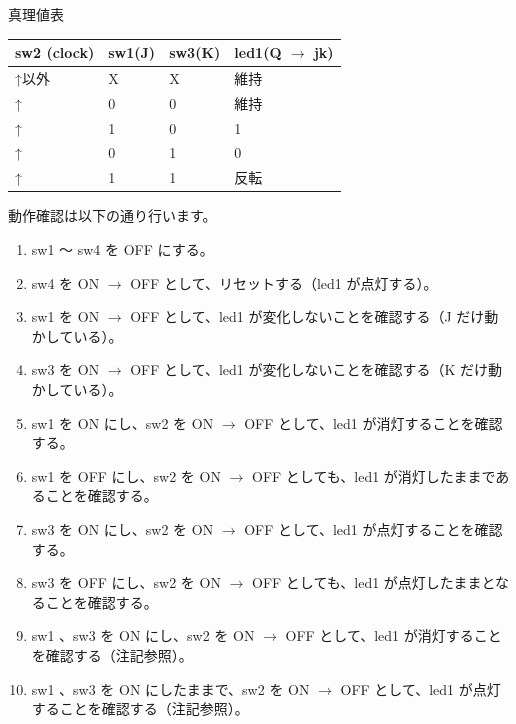 \documentclass[letterpaper,10pt,dvipdfmx]{sphinxmanual}
\begin{document}
\begin{threeparttable}
\capstart\caption{真理値表}\label{05_try:id32}
\begin{tabulary}{\linewidth}{|L|L|L|L|}
\hline
\textsf{\relax 
sw2 (clock)
} & \textsf{\relax 
sw1(J)
} & \textsf{\relax 
sw3(K)
} & \textsf{\relax 
led1(Q \(\rightarrow\) jk)
}\\
\hline
↑以外
 & 
X
 & 
X
 & 
維持
\\
\hline
↑
 & 
0
 & 
0
 & 
維持
\\
\hline
↑
 & 
1
 & 
0
 & 
1
\\
\hline
↑
 & 
0
 & 
1
 & 
0
\\
\hline
↑
 & 
1
 & 
1
 & 
反転
\\
\hline\end{tabulary}

\end{threeparttable}


動作確認は以下の通り行います。
\begin{enumerate}
\item {} 
sw1 ～ sw4 を OFF にする。

\item {} 
sw4 を ON \(\rightarrow\) OFF として、リセットする（led1 が点灯する）。

\item {} 
sw1 を ON \(\rightarrow\) OFF として、led1 が変化しないことを確認する（J だけ動かしている）。

\item {} 
sw3 を ON \(\rightarrow\) OFF として、led1 が変化しないことを確認する（K だけ動かしている）。

\item {} 
sw1 を ON にし、sw2 を ON \(\rightarrow\) OFF として、led1 が消灯することを確認する。

\item {} 
sw1 を OFF にし、sw2 を ON \(\rightarrow\) OFF としても、led1 が消灯したままであることを確認する。

\item {} 
sw3 を ON にし、sw2 を ON \(\rightarrow\) OFF として、led1 が点灯することを確認する。

\item {} 
sw3 を OFF にし、sw2 を ON \(\rightarrow\) OFF としても、led1 が点灯したままとなることを確認する。

\item {} 
sw1 、sw3 を ON にし、sw2 を ON \(\rightarrow\) OFF として、led1 が消灯することを確認する（注記参照）。

\item {} 
sw1 、sw3 を ON にしたままで、sw2 を ON \(\rightarrow\) OFF として、led1 が点灯することを確認する（注記参照）。

\end{enumerate}
\end{document}
